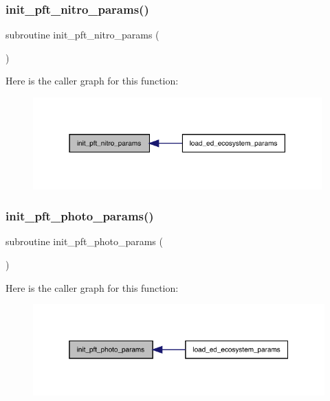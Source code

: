 \subsubsection{\texorpdfstring{init\+\_\+pft\+\_\+nitro\+\_\+params()}{init\_pft\_nitro\_params()}}
{\footnotesize\ttfamily subroutine init\+\_\+pft\+\_\+nitro\+\_\+params (\begin{DoxyParamCaption}{ }\end{DoxyParamCaption})}

Here is the caller graph for this function\+:
\nopagebreak
\begin{figure}[H]
\begin{center}
\leavevmode
\includegraphics[width=315pt]{ed__params_8f90_a1e97106c420d4474c8e99ca03cab1dca_icgraph}
\end{center}
\end{figure}
\mbox{\label{ed__params_8f90_a675fee50cea1da3769cee4b99a67896d}} 
\subsubsection{\texorpdfstring{init\+\_\+pft\+\_\+photo\+\_\+params()}{init\_pft\_photo\_params()}}
{\footnotesize\ttfamily subroutine init\+\_\+pft\+\_\+photo\+\_\+params (\begin{DoxyParamCaption}{ }\end{DoxyParamCaption})}

Here is the caller graph for this function\+:
\nopagebreak
\begin{figure}[H]
\begin{center}
\leavevmode
\includegraphics[width=319pt]{ed__params_8f90_a675fee50cea1da3769cee4b99a67896d_icgraph}
\end{center}
\end{figure}
\mbox{\label{ed__params_8f90_af887dfc134ede40b3777de2e5d21e053}} 
